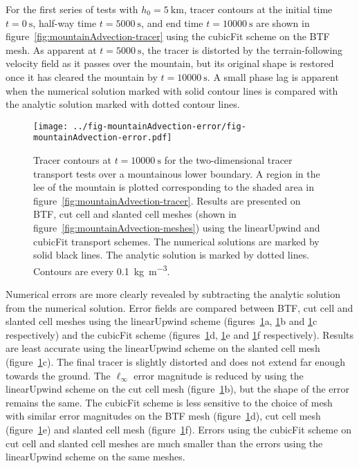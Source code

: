 For the first series of tests with $h_0 = \SI{5}{\kilo\meter}$, tracer contours at the initial time $t=\SI{0}{\second}$, half-way time $t=\SI{5000}{\second}$, and end time $t=\SI{10000}{\second}$ are shown in figure~\ref{fig:mountainAdvection-tracer} using the cubicFit scheme on the BTF mesh.  As apparent at $t=\SI{5000}{\second}$, the tracer is distorted by the terrain-following velocity field as it passes over the mountain, but its original shape is restored once it has cleared the mountain by $t=\SI{10000}{\second}$.
A small phase lag is apparent when the numerical solution marked with solid contour lines is compared with the analytic solution marked with dotted contour lines.

\begin{figure}
	\centering
	\texttt{[image: ../fig-mountainAdvection-error/fig-mountainAdvection-error.pdf]}
	\caption{Tracer contours at $t=\SI{10000}{\second}$ for the two-dimensional tracer transport tests over a mountainous lower boundary.  A region in the lee of the mountain is plotted corresponding to the shaded area in figure~\ref{fig:mountainAdvection-tracer}.  Results are presented on BTF, cut cell and slanted cell meshes (shown in figure~\ref{fig:mountainAdvection-meshes}) using the linearUpwind and cubicFit transport schemes.  The numerical solutions are marked by solid black lines.  The analytic solution is marked by dotted lines.  Contours are every \SI{0.1}{\kilo\gram\per\meter\cubed}.}
	\label{fig:mountainAdvection-errors}
\end{figure}

Numerical errors are more clearly revealed by subtracting the analytic solution from the numerical solution.
Error fields are compared between BTF, cut cell and slanted cell meshes using the linearUpwind scheme (figures~\ref{fig:mountainAdvection-errors}a, \ref{fig:mountainAdvection-errors}b and \ref{fig:mountainAdvection-errors}c respectively) and the cubicFit scheme (figures~\ref{fig:mountainAdvection-errors}d, \ref{fig:mountainAdvection-errors}e and \ref{fig:mountainAdvection-errors}f respectively).
Results are least accurate using the linearUpwind scheme on the slanted cell mesh (figure~\ref{fig:mountainAdvection-errors}c).  The final tracer is slightly distorted and does not extend far enough towards the ground.
The $\ell_\infty$ error magnitude is reduced by using the linearUpwind scheme on the cut cell mesh (figure~\ref{fig:mountainAdvection-errors}b), but the shape of the error remains the same.
The cubicFit scheme is less sensitive to the choice of mesh with similar error magnitudes on the BTF mesh (figure~\ref{fig:mountainAdvection-errors}d), cut cell mesh (figure~\ref{fig:mountainAdvection-errors}e) and slanted cell mesh (figure~\ref{fig:mountainAdvection-errors}f).  Errors using the cubicFit scheme on cut cell and slanted cell meshes are much smaller than the errors using the linearUpwind scheme on the same meshes.

